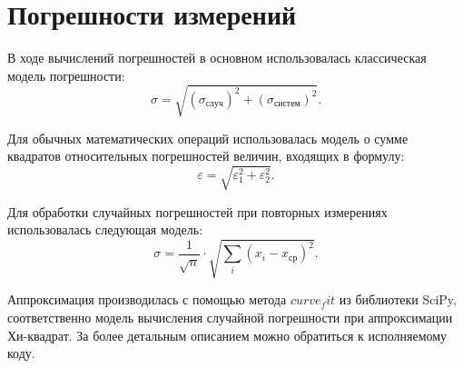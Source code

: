 \documentclass[a4paper,12pt]{extarticle}
\begin{document}
\section{Погрешности измерений}
В ходе вычислений погрешностей в основном использовалась классическая модель погрешности:
$$ \sigma = \sqrt{(\sigma_\text{случ})^2 + (\sigma_\text{систем})^2}.$$

Для обычных математических операций использовалась модель о сумме квадратов относительных погрешностей величин, входящих в формулу:
$$ \varepsilon = \sqrt{\varepsilon_1^2 + \varepsilon_2^2}.$$

Для обработки случайных погрешностей при повторных измерениях использовалась следующая модель:
$$\sigma = \frac{1}{\sqrt{n}} \cdot \sqrt{\sum_i(x_i - x_\text{ср})^2}.$$

Аппроксимация производилась с помощью метода $curve_fit$ из библиотеки SciPy, соответственно модель вычисления случайной погрешности при аппроксимации Хи-квадрат. За более детальным описанием можно обратиться к исполняемому коду.

\newpage
\end{document}
